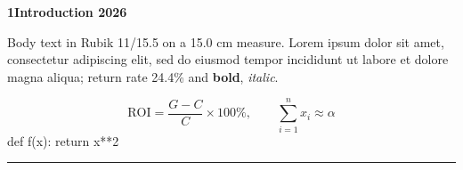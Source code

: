 \documentclass{closettwin}
\begin{document}
{\ctheadfont\bfseries\LARGE 1\quad Introduction 2026}\par
Body text in Rubik 11/15.5 on a 15.0 cm measure. Lorem ipsum dolor sit amet, consectetur adipiscing elit, sed do eiusmod tempor incididunt ut labore et dolore magna aliqua; return rate 24.4\% and \textbf{bold}, \textit{italic}.\par
\[ \mathrm{ROI}=\frac{G-C}{C}\times 100\%,\qquad \sum_{i=1}^{n}x_i\approx\alpha \]
{\ctcodefont def f(x): return x**2}\par
\rule{\textwidth}{0.4pt}
\end{document}
